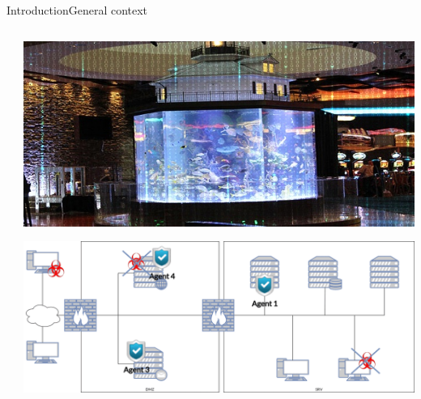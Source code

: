 \begin{frame}{Introduction}{General context}
\begin{columns}
\begin{column}{0.7\textwidth}
        \end{column}

        \begin{column}{0.4\textwidth}
            \includegraphics[width=\linewidth]{figures/casino.jpg}

            \vspace{0.8cm}

            \includegraphics[width=\linewidth]{figures/company_network.png}
        \end{column}

    \end{columns}

\end{frame}

